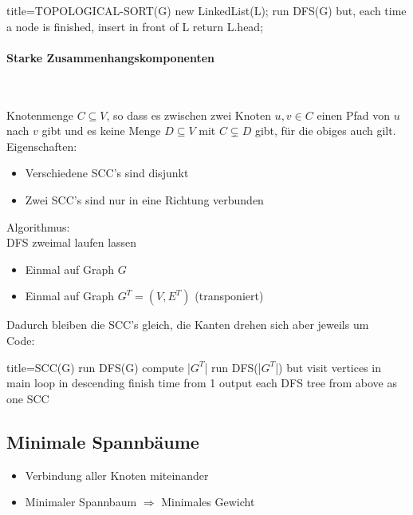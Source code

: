 \documentclass[
    ngerman,
    color=3b,
    dark_mode,
    load_common, %
    summary,
    boxarc,
]{tuda_summary}
\begin{document}
\begin{codeBlock}[autogobble]{title={TOPOLOGICAL-SORT(G)}}
    new LinkedList(L);
    run DFS(G) but, each time a node is finished, insert in front of L
    return L.head;
\end{codeBlock}

\paragraph{Starke Zusammenhangskomponenten}\mbox{}\vspace{-1em}\\
\begin{wrapfigure}[5]{r}{6cm}
    \centering
    \texttt{[image: pictures/scc\\IfDarkModeT\{\_dark]}.PNG}
    \captionof{figure}{Beispiel Starke Zusammenhangskomponenten}
\end{wrapfigure}
Knotenmenge $C \subseteq V$, so dass es zwischen zwei Knoten $u,v \in C$ einen Pfad von $u$ nach $v$ gibt und es keine Menge $D \subseteq V$ mit $C \subsetneq D$ gibt, für die obiges auch gilt.\\
Eigenschaften:
\begin{itemize}
    \item Verschiedene SCC's sind disjunkt
    \item Zwei SCC's sind nur in eine Richtung verbunden
\end{itemize}
Algorithmus:\\
DFS zweimal laufen lassen
\begin{itemize}
    \item Einmal auf Graph $G$
    \item Einmal auf Graph $G^T = (V,E^T)$ (transponiert)
\end{itemize}
Dadurch bleiben die SCC's gleich, die Kanten drehen sich aber jeweils um\vspace{2em}\\
Code:
\begin{codeBlock}[autogobble,escapeinside=||]{title={SCC(G)}}
run DFS(G)
compute |$G^T$|
run DFS(|$G^T$|) but visit vertices in main loop
    in descending finish time from 1
output each DFS tree from above as one SCC
\end{codeBlock}

\clearpage
\subsection{Minimale Spannbäume}
\begin{definition}\mbox{}
    \begin{itemize}
        \item Verbindung aller Knoten miteinander
        \item Minimaler Spannbaum $\Rightarrow$ Minimales Gewicht
    \end{itemize}
\end{definition}
\end{document}
